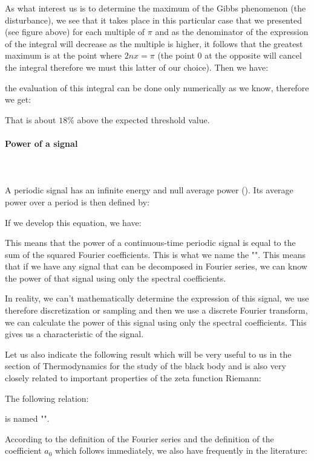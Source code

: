 	As what interest us is to determine the maximum of the Gibbs phenomenon (the disturbance), we see that it takes place in this particular case that we presented (see figure above) for each multiple of $\pi$ and as the denominator of the expression of the integral will decrease as the multiple is higher, it follows that the greatest maximum is at the point where $2nx=\pi$  (the point $0$ at the opposite will cancel the integral therefore we must this latter of our choice). Then we have:
	
	the evaluation of this integral can be done only numerically as we know, therefore we get:
	
	That is about $18\%$ above the expected threshold value.
	
	\paragraph{Power of a signal}\mbox{}\\\\
	A periodic signal has an infinite energy and null average power (). Its average power over a period is then defined by:
	
	If we develop this equation, we have:
	
	This means that the power of a continuous-time periodic signal is equal to the sum of the squared Fourier coefficients. This is what we name the "". This means that if we have any signal that can be decomposed in Fourier series, we can know the power of that signal using only the spectral coefficients.
	
	In reality, we can't mathematically determine the expression of this signal, we use therefore discretization or sampling and then we use a discrete Fourier transform, we can calculate the power of this signal using only the spectral coefficients. This gives us a characteristic of the signal.
	
	Let us also indicate the following result which will be very useful to us in the section of Thermodynamics for the study of the black body and is also very closely related to important properties of the zeta function Riemann:
	
	The following relation:
	
	is named "".
	
	According to the definition of the Fourier series and the definition of the coefficient $a_0$ which follows immediately, we also have frequently in the literature:
	
